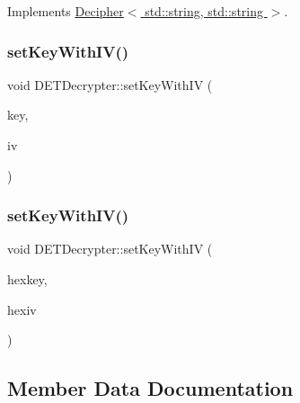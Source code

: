 Implements \hyperlink{classDecipher_a39aea002012130201e12a8fa7d84dda5}{Decipher$<$ std\+::string, std\+::string $>$}.

\mbox{\label{classDETDecrypter_aef2cdd9235fb7d927ab4992fec6efe78}} 
\subsubsection{\texorpdfstring{set\+Key\+With\+I\+V()}{setKeyWithIV()}\hspace{0.1cm}{\footnotesize\ttfamily [1/2]}}
{\footnotesize\ttfamily void D\+E\+T\+Decrypter\+::set\+Key\+With\+IV (\begin{DoxyParamCaption}\item[{Crypto\+P\+P\+::\+Sec\+Byte\+Block \&}]{key,  }\item[{Crypto\+P\+P\+::\+Sec\+Byte\+Block \&}]{iv }\end{DoxyParamCaption})}

\mbox{\label{classDETDecrypter_aea297de1f5c514a5156eabc22c556b3b}} 
\subsubsection{\texorpdfstring{set\+Key\+With\+I\+V()}{setKeyWithIV()}\hspace{0.1cm}{\footnotesize\ttfamily [2/2]}}
{\footnotesize\ttfamily void D\+E\+T\+Decrypter\+::set\+Key\+With\+IV (\begin{DoxyParamCaption}\item[{std\+::string \&}]{hexkey,  }\item[{std\+::string \&}]{hexiv }\end{DoxyParamCaption})}



\subsection{Member Data Documentation}
\mbox{\label{classDETDecrypter_ab598e2e972f3052d372f37d39aae07cf}} 
